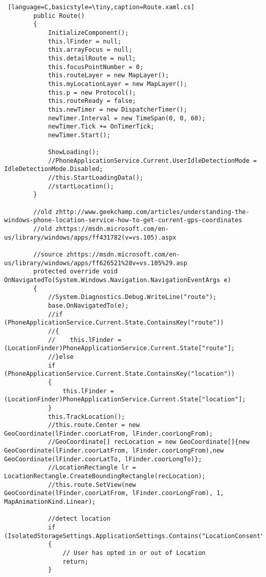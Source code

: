 \begin{lstlisting} [language=C,basicstyle=\tiny,caption=Route.xaml.cs]
        public Route()
        {
            InitializeComponent();
            this.lFinder = null;
            this.arrayFocus = null;
            this.detailRoute = null;
            this.focusPointNumber = 0;
            this.routeLayer = new MapLayer();
            this.myLocationLayer = new MapLayer();
            this.p = new Protocol();
            this.routeReady = false;
            this.newTimer = new DispatcherTimer();
            newTimer.Interval = new TimeSpan(0, 0, 60);
            newTimer.Tick += OnTimerTick;
            newTimer.Start();

            ShowLoading();
            //PhoneApplicationService.Current.UserIdleDetectionMode = IdleDetectionMode.Disabled;
            //this.StartLoadingData();
            //startLocation();
        }

        //old zhttp://www.geekchamp.com/articles/understanding-the-windows-phone-location-service-how-to-get-current-gps-coordinates
        //old zhttps://msdn.microsoft.com/en-us/library/windows/apps/ff431782(v=vs.105).aspx
 
        //source zhttps://msdn.microsoft.com/en-us/library/windows/apps/ff626521%28v=vs.105%29.asp
        protected override void OnNavigatedTo(System.Windows.Navigation.NavigationEventArgs e)
        {
            //System.Diagnostics.Debug.WriteLine("route");
            base.OnNavigatedTo(e);
            //if (PhoneApplicationService.Current.State.ContainsKey("route"))
            //{
            //    this.lFinder = (LocationFinder)PhoneApplicationService.Current.State["route"];
            //}else
            if (PhoneApplicationService.Current.State.ContainsKey("location"))
            {
                this.lFinder = (LocationFinder)PhoneApplicationService.Current.State["location"];
            }
            this.TrackLocation();
            //this.route.Center = new GeoCoordinate(lFinder.coorLatFrom, lFinder.coorLongFrom);
            //GeoCoordinate[] recLocation = new GeoCoordinate[]{new GeoCoordinate(lFinder.coorLatFrom, lFinder.coorLongFrom),new GeoCoordinate(lFinder.coorLatTo, lFinder.coorLongTo)};
            //LocationRectangle lr = LocationRectangle.CreateBoundingRectangle(recLocation);
            //this.route.SetView(new GeoCoordinate(lFinder.coorLatFrom, lFinder.coorLongFrom), 1, MapAnimationKind.Linear);
            
            //detect location
            if (IsolatedStorageSettings.ApplicationSettings.Contains("LocationConsent"))
            {
                // User has opted in or out of Location
                return;
            }
            

\end{lstlisting}
